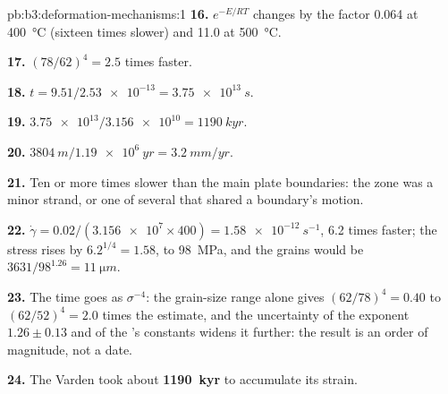 \begin{solution}{pb:b3:deformation-mechanisms:1}
\textbf{16.} $e^{-E/RT}$ changes by the factor 0.064 at \qty{400}{\celsius}
(sixteen times slower) and 11.0 at \qty{500}{\celsius}.

\textbf{17.} $(78/62)^4 = 2.5$ times faster.

\textbf{18.} $t = 9.51/\num{2.53e-13} = \qty{3.75e13}{s}$.

\textbf{19.} $\num{3.75e13}/\num{3.156e10} = \qty{1190}{kyr}$.

\textbf{20.} $\qty{3804}{m}/\qty{1.19e6}{yr} = \qty{3.2}{mm/yr}$.

\textbf{21.} Ten or more times slower than the main plate boundaries: the zone
was a minor strand, or one of several that shared a boundary's motion.

\textbf{22.} $\dot\gamma = 0.02/(\num{3.156e7}\times400) = \qty{1.58e-12}{s^{-1}}$,
6.2 times faster; the stress rises by $6.2^{1/4} = 1.58$, to \qty{98}{MPa}, and
the grains would be $3631/98^{1.26} = \qty{11}{\micro m}$.

\textbf{23.} The time goes as $\sigma^{-4}$: the grain-size range alone gives
$(62/78)^4 = 0.40$ to $(62/52)^4 = 2.0$ times the estimate, and the
uncertainty of the exponent $1.26 \pm 0.13$ and of the 's constants
widens it further: the result is an order of magnitude, not a date.

\textbf{24.} The Varden  took about
\textbf{\qty[text-series-to-math=true]{1190}{kyr}} to accumulate its strain.
\end{solution}
